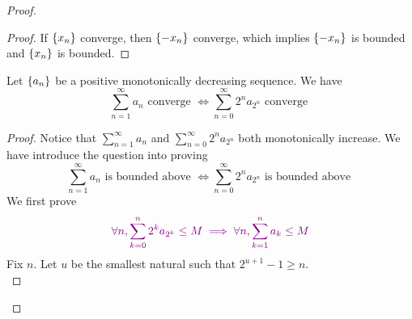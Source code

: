 \documentclass{report}
\begin{document}
\begin{proof}
\begin{proof}
If $\{ x_n \}$ converge, then $\{ -x_n \}$ converge, which implies $\{ -x_n \}$ is bounded and $\{ x_n \}$ is bounded.
\end{proof}
\begin{lemma}
\label{2.2.11}
Let $\{ a_n \}$ be a positive monotonically decreasing sequence. We have
 \begin{equation}
\sum_{n=1}^\infty a_n\text{ converge }\iff \sum_{n=0}^\infty 2^na_{2^n}\text{ converge }
\end{equation}
\end{lemma}
\begin{proof}
Notice that $\sum_{n=1}^\infty a_n$ and $\sum_{n=0}^\infty 2^n a_{2^n}$ both monotonically increase. We have introduce the question into proving 
\begin{equation}
\sum_{n=1}^\infty a_n\text{ is bounded above }\iff \sum_{n=0}^\infty 2^na_{2^n}\text{ is bounded above }
\end{equation}
We first prove
\begin{equation}
\textcolor{violet}{\forall n,\sum_{k=0}^n 2^ka_{2^k}\leq M\implies \forall n,\sum_{k=1}^n a_k\leq M}
\end{equation}
Fix $n$. Let  $u$ be the smallest natural such that  $2^{u+1}-1\geq n$.\\


\end{proof}
\end{proof}
\end{document}
